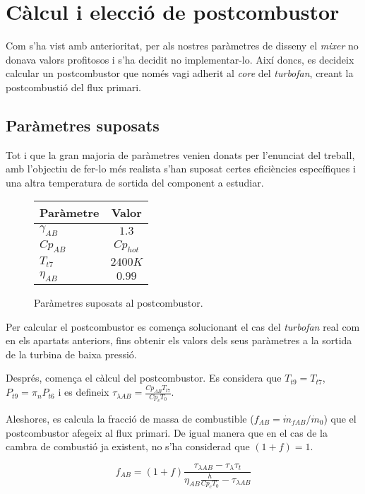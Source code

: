 \section{Càlcul i elecció de postcombustor}
Com s'ha vist amb anterioritat, per als nostres paràmetres de disseny el \textit{mixer} no donava valors profitosos i s'ha decidit no implementar-lo. Així doncs, es decideix calcular un postcombustor que només vagi adherit al \textit{core} del \textit{turbofan}, creant la postcombustió del flux primari.

\subsection{Paràmetres suposats }
Tot i que la gran majoria de paràmetres venien donats per l'enunciat del treball, amb l'objectiu de fer-lo més realista s'han suposat certes eficiències específiques i una altra temperatura de sortida del component a estudiar.

\begin{figure}[H]
	\centering
	\begin{tabular}{lc}
		\toprule[3pt]
		\textbf{Paràmetre}&\textbf{Valor}\\
		\midrule[1pt]
		$\gamma_{AB}$ & $1.3$\\
		$ Cp_{AB}$ & $Cp_{hot}$\\
		$T_{t7}$ & $2400K$\\
		$\eta_{AB}$ & $0.99$\\
		
		\bottomrule[2pt]
	\end{tabular}
	\label{ABparam}
	\caption{Paràmetres suposats al postcombustor.}
\end{figure}


\noindent Per calcular el postcombustor es comença solucionant el cas del \textit{turbofan} real com en els apartats anteriors, fins obtenir els valors dels seus paràmetres a la sortida de la turbina de baixa pressió.

\noindent Després, comença el càlcul del postcombustor. Es considera que $T_{t9} = T_{t7}$, $P_{t9}=\pi_nP_{t6}$ i es defineix $\tau_{\lambda AB} = \frac{Cp_{AB}T_{t7}}{Cp_cT_0}$.

\noindent Aleshores, es calcula la fracció de massa de combustible ($f_{AB}=\dot{m}_{fAB}/\dot{m}_0$) que el postcombustor afegeix al flux primari. De igual manera que en el cas de la cambra de combustió ja existent, no s'ha considerad que $(1+f)=1$.

\begin{equation}
	f_{AB}=(1+f)\frac{\tau_{\lambda AB}-\tau_{\lambda}\tau_t}{\eta_{AB}\frac{h}{Cp_cT_0}-\tau_{\lambda AB}}
\end{equation}
 
